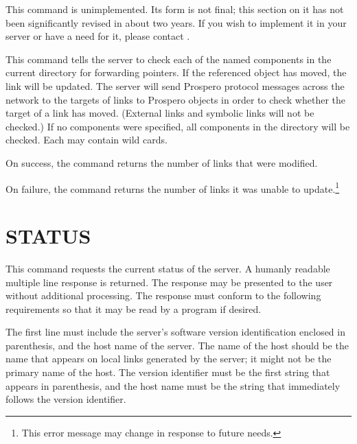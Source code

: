 This command is unimplemented.  Its form is not final; this section on
it has not been significantly revised in about two years.   If you
wish to implement it in your server or have a need for it, please
contact .

This command tells the server to check each of the named components in
the current directory for forwarding pointers.  If the referenced
object has moved, the link will be updated.  The server will send
Prospero protocol messages across the network to the targets of links
to Prospero objects in order to check whether the target of a link has
moved.   (External links and symbolic links will not be checked.)  If
no components were specified, all components in the
directory will be checked.  Each  may contain
wild cards.

On success, the  command returns the
number of links that were modified.

\begin{command}
    
\end{command}

On failure, the  command returns the number of links it
was unable to update.\footnote{
	This error message may change in response to future needs.}

\begin{command}
    
\end{command}

\section{STATUS}

This command requests the current status of the server.  A humanly
readable multiple line response is returned.  The response may be
presented to the user without additional processing.  The response
must conform to the following requirements so that it may be read by a
program if desired.

The first line must include the server's software version
identification enclosed in parenthesis, and the host name of the
server.  The name of the host should be the name that appears on local
links generated by the server; it might not be the primary name of the
host.  The version identifier must be the first string that appears in
parenthesis, and the host name must be the string that immediately
follows the version identifier.

